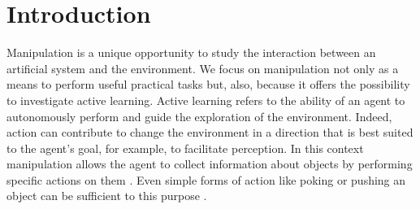\section{Introduction}
\label{sect:intro}
Manipulation is a unique opportunity to study the interaction between an artificial system and the environment. We focus on manipulation not only as a means to perform useful practical tasks but, also, because it offers the possibility to investigate active learning. Active learning refers to the ability of an agent to autonomously perform and guide the exploration of the environment. Indeed, action can contribute to change the environment in a direction that is best suited to the agent's goal, for example, to facilitate perception. In this context manipulation allows the agent to collect information about objects by performing specific actions on them \cite{metta03early}. Even simple forms of action like poking or pushing an object can be sufficient to this purpose \cite{fitzpatrick03learning}.


